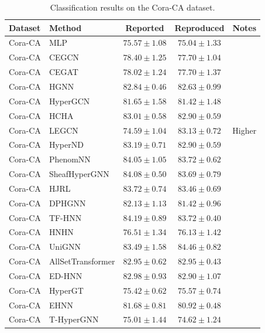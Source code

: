\vspace{3em} 

\begin{table}[H]
    \centering \small
    \renewcommand{\arraystretch}{1.12} 
    \begin{tabular}{llccc}
        \toprule
        Dataset & Method & Reported & Reproduced & Notes \\
        \midrule
        Cora-CA & MLP & \(75.57 \pm 1.08\) & \(75.04 \pm 1.33\) & \\
        Cora-CA & CEGCN & \(78.40 \pm 1.25\) & \(77.70 \pm 1.04\) & \\
        Cora-CA & CEGAT & \(78.02 \pm 1.24\) & \(77.70 \pm 1.37\) & \\
        \grprule
        Cora-CA & HGNN & \(82.84 \pm 0.46\) & \(82.63 \pm 0.99\) & \\
        Cora-CA & HyperGCN & \(81.65 \pm 1.58\) & \(81.42 \pm 1.48\) & \\
        Cora-CA & HCHA & \(83.01 \pm 0.58\) & \(82.90 \pm 0.59\) & \\
        Cora-CA & LEGCN & \(74.59 \pm 1.04\) & \(83.13 \pm 0.72\) & Higher \\
        Cora-CA & HyperND & \(83.19 \pm 0.71\) & \(82.90 \pm 0.59\) & \\
        Cora-CA & PhenomNN & \(84.05 \pm 1.05\) & \(83.72 \pm 0.62\) & \\
        Cora-CA & SheafHyperGNN & \(84.08 \pm 0.50\) & \(83.69 \pm 0.79\) & \\
        Cora-CA & HJRL & \(83.72 \pm 0.74\) & \(83.46 \pm 0.69\) & \\
        Cora-CA & DPHGNN & \(82.13 \pm 1.13\) & \(81.42 \pm 0.96\) & \\
        Cora-CA & TF-HNN & \(84.19 \pm 0.89\) & \(83.72 \pm 0.40\) & \\
        \grprule
        Cora-CA & HNHN & \(76.51 \pm 1.34\) & \(76.13 \pm 1.42\) & \\
        Cora-CA & UniGNN & \(83.49 \pm 1.58\) & \(84.46 \pm 0.82\) & \\
        Cora-CA & AllSetTransformer & \(82.95 \pm 0.62\) & \(82.95 \pm 0.43\) & \\
        Cora-CA & ED-HNN & \(82.98 \pm 0.93\) & \(82.90 \pm 1.07\) & \\
        Cora-CA & HyperGT & \(75.42 \pm 0.62\) & \(75.57 \pm 0.74\) & \\
        \grprule
        Cora-CA & EHNN & \(81.68 \pm 0.81\) & \(80.92 \pm 0.48\) & \\
        Cora-CA & T-HyperGNN & \(75.01 \pm 1.44\) & \(74.62 \pm 1.24\) & \\
        \bottomrule
    \end{tabular}
    \caption{Classification results on the Cora-CA dataset.}
\end{table}

